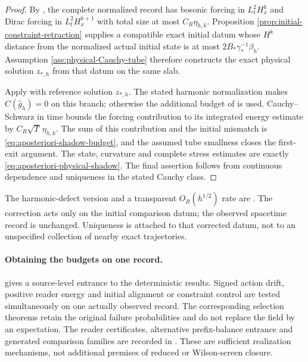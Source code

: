 \documentclass[11pt]{article}
\numberwithin{equation}{section}
\theoremstyle{definition}
\theoremstyle{remark}
\begin{document}
\begin{proof}
By , the complete normalized record has
bosonic forcing in $L^2_tH_x^k$ and Dirac forcing in
$L^2_tH_x^{k+1}$ with total size at most $C_R\eta_{h,k}$.  Proposition
\ref{prop:initial-constraint-retraction} supplies a compatible exact initial
datum whose $H^k$ distance from the normalized actual initial state is at most
$2B_*\gamma_*^{-1}\beta_h$.  Assumption
\ref{ass:physical-Cauchy-tube} therefore constructs the exact physical
solution $z_{*,h}$ from that datum on the same slab.

Apply  with reference solution $z_{*,h}$.
The stated harmonic normalization makes $C(\widehat g_h)=0$ on this branch;
otherwise the additional budget of  is used.
Cauchy--Schwarz in time bounds the forcing contribution to its integrated
energy estimate by $C_R\sqrt T\,\eta_{h,k}$.  The sum of this contribution and
the initial mismatch is \eqref{eq:aposteriori-shadow-budget}, and the assumed
tube smallness closes the first-exit argument.  The state, curvature and
complete stress estimates are exactly
\eqref{eq:aposteriori-physical-shadow}.  The final assertion follows from
continuous dependence and uniqueness in the stated Cauchy class.
\end{proof}

The harmonic-defect version and a transparent $O_R(h^{1/2})$ rate are
. The correction
acts only on the initial comparison datum; the observed spacetime record
is unchanged. Uniqueness is attached to that corrected datum, not to an
unspecified collection of nearby exact trajectories.

\paragraph{Obtaining the budgets on one record.}
\label{subsec:quantitative-source-bridge}
 gives a source-level entrance to the deterministic
results. Signed action drift, positive reader energy and initial alignment
or constraint control are tested simultaneously on one actually observed
record. The corresponding selection theorems retain the original failure
probabilities and do not replace the field by an expectation.
The reader certificates, alternative prefix-balance entrance and generated
comparison families are recorded in
.
These are sufficient realization mechanisms, not additional premises of
reduced or Wilson-screen closure.
\end{document}
